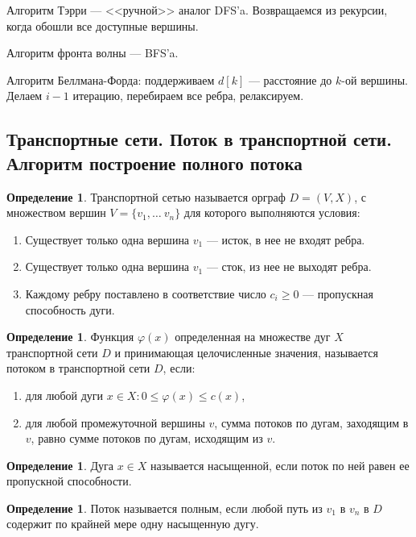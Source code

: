\documentclass[12pt]{report}
\theoremstyle{definition}
\newtheorem{definition}[theorem]{Определение}
\begin{document}
Алгоритм Тэрри --- <<ручной>> аналог DFS'a. Возвращаемся из рекурсии, когда обошли
все доступные вершины.

Алгоритм фронта волны --- BFS'a.

Алгоритм Беллмана-Форда: поддерживаем $d[k]$ --- расстояние до $k$-ой вершины.
Делаем $i-1$ итерацию, перебираем все ребра, релаксируем.

\subsection
{
  Транспортные сети. Поток в транспортной сети.
  Алгоритм построение полного потока
}

\begin{definition}
Транспортной сетью называется орграф $D = (V, X)$, с множеством вершин
$V = \{v_1, \dots \ v_n\}$ для которого выполняются условия:
\begin{enumerate}
\item Существует только одна вершина $v_1$ --- исток, в нее не
  входят ребра.
\item Существует только одна вершина $v_1$ --- сток, из нее не
  выходят ребра.
\item Каждому ребру поставлено в соответствие число $c_i \ge 0$ --- пропускная
  способность дуги.
\end{enumerate}
\end{definition}

\begin{definition}
Функция $\varphi(x)$ определенная на множестве дуг $X$ транспортной сети $D$
и принимающая целочисленные значения, называется потоком в транспортной сети
$D$, если:
\begin{enumerate}
\item для любой дуги $x \in X: 0 \le \varphi(x) \le c(x)$,
\item для любой промежуточной вершины $v$, сумма потоков по дугам, заходящим в
$v$, равно сумме потоков по дугам, исходящим из $v$.
\end{enumerate}
\end{definition}

\begin{definition}
Дуга $x\in X$ называется насыщенной, если поток по ней равен ее
пропускной способности.
\end{definition}

\begin{definition}
Поток называется полным, если любой путь из $v_1$ в $v_n$ в $D$
содержит по крайней мере одну насыщенную дугу.
\end{definition}
\end{document}
